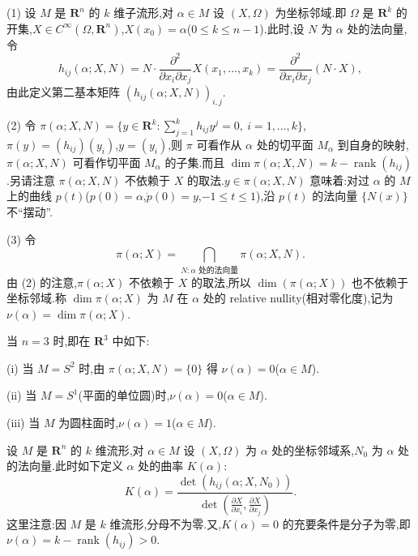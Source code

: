 \begin{definition}\label{def:3.4.20}
(1) 设 $M$ 是 $\mathbf{R}^{n}$ 的 $k$ 维子流形,对 $\alpha \in M$ 设 $(X, \Omega)$ 为坐标邻域.即 $\Omega$ 是 $\mathbf{R}^{k}$ 的开集,$X \in C^{\infty}(\Omega, \mathbf{R}^{n})$,$X(x_{0}) = \alpha$($0 \leq k \leq n - 1$).此时,设 $N$ 为 $\alpha$ 处的法向量,令
\begin{equation*}
h_{ij}(\alpha; X, N) = N \cdot \frac{\partial^{2}}{\partial x_{i}\partial x_{j}}X(x_{1}, \ldots, x_{k}) = \frac{\partial^{2}}{\partial x_{i}\partial x_{j}}(N \cdot X),
\end{equation*}
由此定义第二基本矩阵 $(h_{ij}(\alpha; X, N))_{i,j}$.

(2) 令 $\pi(\alpha; X, N) = \{y \in \mathbf{R}^{k}: \sum_{j=1}^{k}h_{ij}y^{j} = 0,\ i = 1, \ldots, k\}$,$\pi(y) = (h_{ij})(y_{i})$,$y = (y_{i})$,则 $\pi$ 可看作从 $\alpha$ 处的切平面 $M_{\alpha}$ 到自身的映射,$\pi(\alpha; X, N)$ 可看作切平面 $M_{\alpha}$ 的子集.而且 $\dim\pi(\alpha; X, N) = k - \operatorname{rank}(h_{ij})$.另请注意 $\pi(\alpha; X, N)$ 不依赖于 $X$ 的取法.$y \in \pi(\alpha; X, N)$ 意味着:对过 $\alpha$ 的 $M$ 上的曲线 $p(t)$($p(0) = \alpha$,$\dot{p}(0) = y$,$-1 \leq t \leq 1$),沿 $p(t)$ 的法向量 $\{N(x)\}$ 不``摆动''.

(3) 令
\begin{equation*}
\pi(\alpha; X) = \bigcap_{N: \alpha \text{ 处的法向量}}\pi(\alpha; X, N).
\end{equation*}
由 (2) 的注意,$\pi(\alpha; X)$ 不依赖于 $X$ 的取法,所以 $\dim(\pi(\alpha; X))$ 也不依赖于坐标邻域.称 $\dim\pi(\alpha; X)$ 为 $M$ 在 $\alpha$ 处的 relative nullity(相对零化度),记为 $\nu(\alpha) = \dim\pi(\alpha; X)$.
\end{definition}

\begin{example}\label{exa:3.4.21}
当 $n = 3$ 时,即在 $\mathbf{R}^{3}$ 中如下:

(i) 当 $M = S^{2}$ 时,由 $\pi(\alpha; X, N) = \{0\}$ 得 $\nu(\alpha) = 0$($\alpha \in M$).

(ii) 当 $M = S^{1}$(平面的单位圆)时,$\nu(\alpha) = 0$($\alpha \in M$).

(iii) 当 $M$ 为圆柱面时,$\nu(\alpha) = 1$($\alpha \in M$).
\end{example}

\begin{definition}\label{def:3.4.22}
设 $M$ 是 $\mathbf{R}^{n}$ 的 $k$ 维流形,对 $\alpha \in M$ 设 $(X, \Omega)$ 为 $\alpha$ 处的坐标邻域系,$N_{0}$ 为 $\alpha$ 处的法向量.此时如下定义 $\alpha$ 处的曲率 $K(\alpha)$:
\begin{equation*}
K(\alpha) = \frac{\det(h_{ij}(\alpha; X, N_{0}))}{\det\left(\frac{\partial X}{\partial x_{i}}, \frac{\partial X}{\partial x_{j}}\right)}.
\end{equation*}
这里注意:因 $M$ 是 $k$ 维流形,分母不为零.又,$K(\alpha) = 0$ 的充要条件是分子为零,即 $\nu(\alpha) = k - \operatorname{rank}(h_{ij}) > 0$.
\end{definition}

